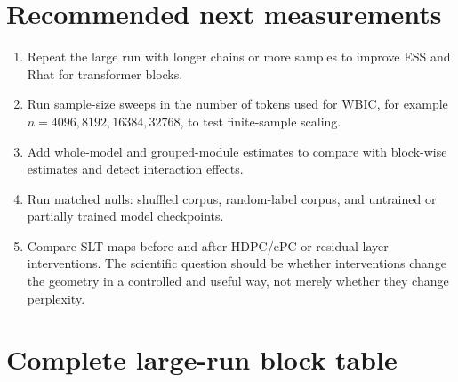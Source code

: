 \documentclass[11pt]{article}
\begin{document}
\section{Recommended next measurements}

\begin{enumerate}[leftmargin=*]
\item Repeat the large run with longer chains or more samples to improve ESS and
Rhat for transformer blocks.
\item Run sample-size sweeps in the number of tokens used for WBIC, for example
\(n = 4096, 8192, 16384, 32768\), to test finite-sample scaling.
\item Add whole-model and grouped-module estimates to compare with block-wise
estimates and detect interaction effects.
\item Run matched nulls: shuffled corpus, random-label corpus, and untrained or
partially trained model checkpoints.
\item Compare SLT maps before and after HDPC/ePC or residual-layer interventions.
The scientific question should be whether interventions change the geometry in
a controlled and useful way, not merely whether they change perplexity.
\end{enumerate}

\appendix
\section{Complete large-run block table}
\end{document}
